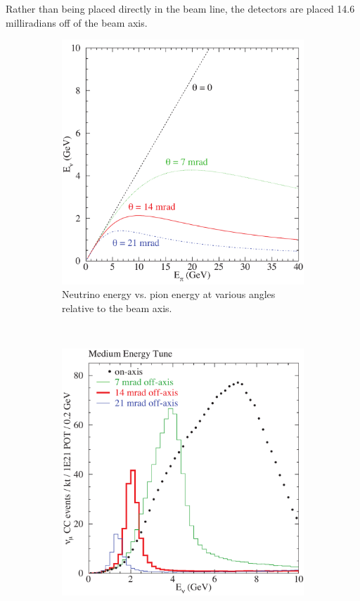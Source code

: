 Rather than being placed directly in the \numi beam line, the \nova detectors are placed 14.6 milliradians off of the beam axis.  
\begin{figure}[t]
\centering
\begin{subfigure}[c]{0.47\textwidth}
                \centering
                \includegraphics[width=\textwidth]{plots_nova/EnuVsEpi.pdf}
                \caption{Neutrino energy vs. pion energy at various angles relative to the beam axis.}
                 \label{EnuEpi}
        \end{subfigure}
        ~
\begin{subfigure}[c]{0.47\textwidth}
                \centering
                \includegraphics[width=\textwidth]{plots_nova/energySpectrum.pdf}

\end{subfigure}
\end{figure}
